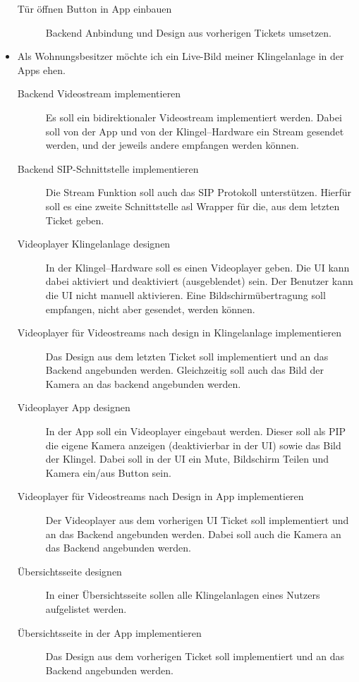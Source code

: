 \begin{itemize}
\begin{description}
            \item[Tür öffnen Button in App einbauen] Backend Anbindung und Design aus vorherigen Tickets umsetzen.
        \end{description}
    \item Als Wohnungsbesitzer möchte ich ein Live-Bild meiner Klingelanlage in der Apps ehen.
        \begin{description}
            \item[Backend Videostream implementieren] Es soll ein bidirektionaler Videostream implementiert werden.
                Dabei soll von der App und von der Klingel--Hardware ein Stream gesendet werden, und der jeweils andere empfangen werden können.
            \item[Backend SIP-Schnittstelle implementieren] Die Stream Funktion soll auch das SIP Protokoll unterstützen.
                Hierfür soll es eine zweite Schnittstelle asl Wrapper für die, aus dem letzten Ticket geben.
            \item[Videoplayer Klingelanlage designen] In der Klingel--Hardware soll es einen Videoplayer geben.
                Die UI kann dabei aktiviert und deaktiviert (ausgeblendet) sein.
                Der Benutzer kann die UI nicht manuell aktivieren.
                Eine Bildschirmübertragung soll empfangen, nicht aber gesendet, werden können.
            \item[Videoplayer für Videostreams nach design in Klingelanlage implementieren] Das Design aus dem letzten Ticket soll implementiert und an das Backend angebunden werden.
                Gleichzeitig soll auch das Bild der Kamera an das backend angebunden werden.
            \item[Videoplayer App designen] In der App soll ein Videoplayer eingebaut werden.
                Dieser soll als PIP die eigene Kamera anzeigen (deaktivierbar in der UI) sowie das Bild der Klingel.
                Dabei soll in der UI ein Mute, Bildschirm Teilen und Kamera ein/aus Button sein.
            \item[Videoplayer für Videostreams nach Design in App implementieren] Der Videoplayer aus dem vorherigen UI Ticket soll implementiert und an das Backend angebunden werden.
                Dabei soll auch die Kamera an das Backend angebunden werden.
            \item[Übersichtsseite  designen] In einer Übersichtsseite sollen alle Klingelanlagen eines Nutzers aufgelistet werden.
            \item[Übersichtsseite  in der App implementieren] Das Design aus dem vorherigen Ticket soll implementiert und an das Backend angebunden werden.

\end{description}
\end{itemize}

